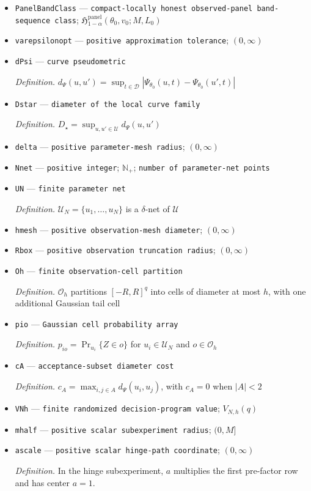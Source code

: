 \documentclass{article}
\begin{document}
\begin{itemize}
  \item \texttt{PanelBandClass} --- \texttt{compact-\allowbreak{}locally honest observed-\allowbreak{}panel band-\allowbreak{}sequence class}; \(\mathfrak H^{\mathrm{panel}}_{1-\alpha}(\theta_0,v_0;M,L_0)\)
  \item \texttt{varepsilonopt} --- \texttt{positive approximation tolerance}; \((0,\infty)\)
  \item \texttt{dPsi} --- \texttt{curve pseudometric}
  \par\smallskip\noindent\emph{Definition.} \(d_{\Psi}(u,u')=\sup_{t\in\mathcal D}|\Psi_{\theta_0}(u,t)-\Psi_{\theta_0}(u',t)|\)
  \item \texttt{Dstar} --- \texttt{diameter of the local curve family}
  \par\smallskip\noindent\emph{Definition.} \(D_{\star}=\sup_{u,u'\in\mathcal U}d_{\Psi}(u,u')\)
  \item \texttt{delta} --- \texttt{positive parameter-\allowbreak{}mesh radius}; \((0,\infty)\)
  \item \texttt{Nnet} --- \texttt{positive integer}; \(\mathbb N_{+}\); \texttt{number of parameter-\allowbreak{}net points}
  \item \texttt{UN} --- \texttt{finite parameter net}
  \par\smallskip\noindent\emph{Definition.} \(\mathcal U_N=\{u_1,\ldots,u_N\}\) is a \(\delta\)-net of \(\mathcal U\)
  \item \texttt{hmesh} --- \texttt{positive observation-\allowbreak{}mesh diameter}; \((0,\infty)\)
  \item \texttt{Rbox} --- \texttt{positive observation truncation radius}; \((0,\infty)\)
  \item \texttt{Oh} --- \texttt{finite observation-\allowbreak{}cell partition}
  \par\smallskip\noindent\emph{Definition.} \(\mathcal O_h\) partitions \([-R,R]^q\) into cells of diameter at most \(h\), with one additional Gaussian tail cell
  \item \texttt{pio} --- \texttt{Gaussian cell probability array}
  \par\smallskip\noindent\emph{Definition.} \(p_{io}=\Pr_{u_i}\{Z\in o\}\) for \(u_i\in\mathcal U_N\) and \(o\in\mathcal O_h\)
  \item \texttt{cA} --- \texttt{acceptance-\allowbreak{}subset diameter cost}
  \par\smallskip\noindent\emph{Definition.} \(c_A=\max_{i,j\in A}d_{\Psi}(u_i,u_j)\), with \(c_A=0\) when \(|A|<2\)
  \item \texttt{VNh} --- \texttt{finite randomized decision-\allowbreak{}program value}; \(V_{N,h}(q)\)
  \item \texttt{mhalf} --- \texttt{positive scalar subexperiment radius}; \((0,M]\)
  \item \texttt{ascale} --- \texttt{positive scalar hinge-\allowbreak{}path coordinate}; \((0,\infty)\)
  \par\smallskip\noindent\emph{Definition.} In the hinge subexperiment, \(a\) multiplies the first pre-factor row and has center \(a=1\).
\end{itemize}
\end{document}
